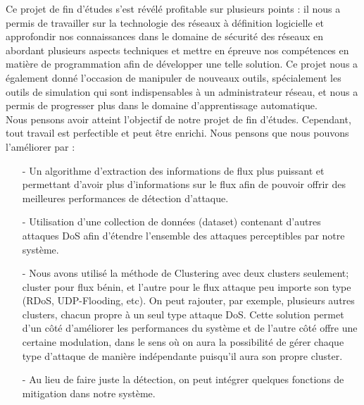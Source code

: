 \noindent Ce projet de fin d’études s'est révélé profitable sur plusieurs points : il nous a permis de travailler sur la technologie des réseaux à définition logicielle et approfondir nos connaissances dans le domaine de sécurité des réseaux en abordant plusieurs aspects techniques et mettre en épreuve nos compétences en matière de programmation afin de développer une telle solution. Ce projet nous a également donné l'occasion de manipuler de nouveaux outils, spécialement les outils de simulation qui sont indispensables à un administrateur réseau, et nous a permis de progresser plus dans le domaine d'apprentissage automatique.\\

\noindent Nous pensons avoir atteint l’objectif de notre projet de fin d’études. Cependant, tout travail est perfectible et peut être enrichi. Nous pensons que nous pouvons l’améliorer par :\\ 
\begin{itemize}
\item[-] Un algorithme d’extraction des informations de flux plus puissant et permettant d’avoir plus d’informations sur le flux afin de pouvoir offrir des meilleures performances de détection d’attaque.\\
\item[-] Utilisation d'une collection de données (dataset) contenant d'autres attaques DoS afin d'étendre l'ensemble des attaques perceptibles par notre système.\\
\item[-] Nous avons utilisé la méthode de Clustering avec deux clusters seulement; cluster pour flux bénin, et l'autre pour le flux attaque peu importe son type (RDoS, UDP-Flooding, etc). On peut rajouter, par exemple, plusieurs autres clusters, chacun propre à un seul type attaque DoS. Cette solution permet d'un côté d'améliorer les performances du système et de l'autre côté offre une certaine modulation, dans le sens où on aura la possibilité de gérer chaque type d'attaque de manière indépendante puisqu'il aura son propre cluster.\\
\item[-] Au lieu de faire juste la détection, on peut intégrer quelques fonctions de mitigation dans notre système.\\ 
\end{itemize}




